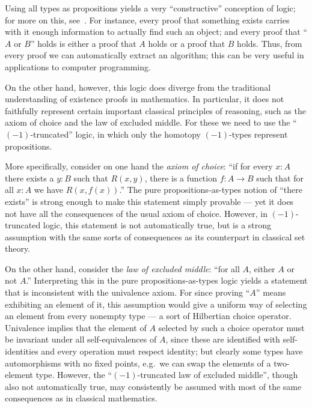 Using all types as propositions yields a very ``constructive'' conception of logic; for more on this, see~\cite{kolmogorov,TroelstraI,TroelstraII}.
For instance, every proof that something exists carries with it enough information to actually find such an object;
and every proof that ``$A$ or $B$'' holds is either a proof that $A$ holds or a proof that $B$ holds.
Thus, from every proof we can automatically extract an algorithm;  this can be very useful in applications to computer programming.

On the other hand, however, this logic does diverge from the traditional understanding of existence proofs in mathematics.
In particular, it does not faithfully represent certain important classical principles of reasoning, such as the axiom of choice and the law of excluded middle.
For these we need to use the ``$(-1)$-truncated'' logic, in which only the homotopy $(-1)$-types represent propositions.

%
More specifically, consider on one hand the \emph{axiom of choice}: ``if for every $x: A$ there exists a $y:B$ such that $R(x,y)$, there is a function $f : A\to B$ such that for all $x:A$ we have $R(x, f(x))$.''
The pure propositions-as-types notion of ``there exists'' is strong enough to make this statement simply provable --- yet it does not have all the consequences of the usual axiom of choice.
However, in $(-1)$-truncated logic, this statement is not automatically true, but is a strong assumption 
with the same sorts of consequences as its counterpart in classical set theory.

%
%
On the other hand, consider the \emph{law of excluded middle}: ``for all $A$, either $A$ or not $A$.''
Interpreting this in the pure propositions-as-types logic yields a statement that is inconsistent with the univalence axiom.
For since proving ``$A$'' means exhibiting an element of it, this assumption would give a uniform way of selecting an element from every nonempty type --- a sort of Hilbertian choice operator.
Univalence implies that the element of $A$ selected by such a choice operator must be invariant under all self-equivalences of $A$,
since these are identified with self-identities and every operation must respect identity;
but clearly some types have automorphisms with no fixed points, e.g.\ we can swap the elements of a two-element type.
%
However, the ``$(-1)$-truncated law of excluded middle'', though also not automatically true, may consistently be assumed with most of the same consequences as in classical mathematics.

